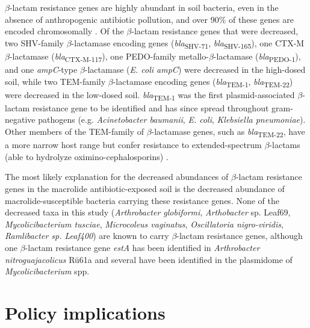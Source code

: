 $\beta$-lactam resistance genes are highly abundant in soil bacteria, even in the absence of anthropogenic antibiotic pollution, and over 90\% of these genes are encoded chromosomally \parencite{Dunivin.2019, vanGoethem.2018, Mindlin.2017}.
Of the $\beta$-lactam resistance genes that were decreased, two SHV-family $\beta$-lactamase encoding genes (\textit{bla}\textsubscript{SHV-71}, \textit{bla}\textsubscript{SHV-165}), one CTX-M $\beta$-lactamase (\textit{bla}\textsubscript{CTX-M-117}), one PEDO-family metallo-$\beta$-lactamase (\textit{bla}\textsubscript{PEDO-1}), and one \textit{ampC}-type $\beta$-lactamase (\textit{E. coli ampC}) were decreased in the high-dosed soil, while two TEM-family $\beta$-lactamase encoding genes (\textit{bla}\textsubscript{TEM-1}, \textit{bla}\textsubscript{TEM-22}) were decreased in the low-dosed soil.
\textit{bla}\textsubscript{TEM-1} was the first plasmid-associated $\beta$-lactam resistance gene to be identified and has since spread throughout gram-negative pathogens (e.g. \textit{Acinetobacter baumanii}, \textit{E. coli}, \textit{Klebsiella pneumoniae}).
Other members of the TEM-family of $\beta$-lactamase genes, such as \textit{bla}\textsubscript{TEM-22}, have a more narrow host range but confer resistance to extended-spectrum $\beta$-lactams (able to hydrolyze oximino-cephalosporins) \parencite{Bradford.2001, Garlet.1993}.

The most likely explanation for the decreased abundances of $\beta$-lactam resistance genes in the macrolide antibiotic-exposed soil is the decreased abundance of macrolide-susceptible bacteria carrying these resistance genes.
None of the decreased taxa in this study (\textit{Arthrobacter globiformi}, \textit{Arthobacter} sp. Leaf69, \textit{Mycolicibacterium tusciae}, \textit{Microcoleus vaginatus}, \textit{Oscillatoria nigro-viridis}, \textit{Ramlibacter sp. Leaf400}) are known to carry $\beta$-lactam resistance genes, although one $\beta$-lactam resistance gene \textit{estA} has been identified in \textit{Arthrobacter nitroguajacolicus} Rü61a and several have been identified in the plasmidome of \textit{Mycolicibacterium} spp.


\section{Policy implications}

